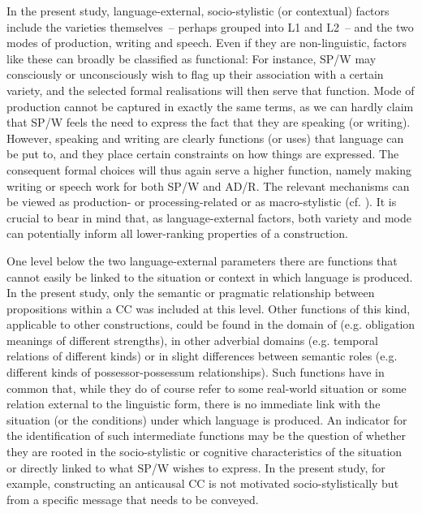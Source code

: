 In the present study, language-external, socio-stylistic (or contextual) factors include the varieties themselves~– perhaps grouped into L1 and L2~– and the two modes of production, writing and speech. Even if they are non-linguistic, factors like these can broadly be classified as functional: For instance, SP/W may consciously or unconsciously wish to flag up their association with a certain variety, and the selected formal realisations will then serve that function. Mode of production cannot be captured in exactly the same terms, as we can hardly claim that SP/W feels the need to express the fact that they are speaking (or writing). However, speaking and writing are clearly functions (or uses) that language can be put to, and they place certain constraints on how things are expressed. The consequent formal choices will thus again serve a higher function, namely making writing or speech work for both SP/W and AD/R. The relevant mechanisms can be viewed as production- or processing-related or as macro-stylistic (cf. ). It is crucial to bear in mind that, as language-external factors, both variety and mode can potentially inform all lower-ranking properties of a construction.

One level below the two language-external parameters there are functions that cannot easily be linked to the situation or context in which language is produced. In the present study, only the semantic or pragmatic relationship between propositions within a CC was included at this level. Other functions of this kind, applicable to other constructions, could be found in the domain of  (e.g. obligation meanings of different strengths), in other adverbial domains (e.g. temporal relations of different kinds) or in slight differences between semantic roles (e.g. different kinds of possessor-possessum relationships). Such functions have in common that, while they do of course refer to some real-world situation or some relation external to the linguistic form, there is no immediate link with the situation (or the conditions) under which language is produced. An indicator for the identification of such intermediate functions may be the question of whether they are rooted in the socio-stylistic or cognitive characteristics of the situation or directly linked to what SP/W wishes to express. In the present study, for example, constructing an anticausal CC is not motivated socio-stylistically but from a specific message that needs to be conveyed.

